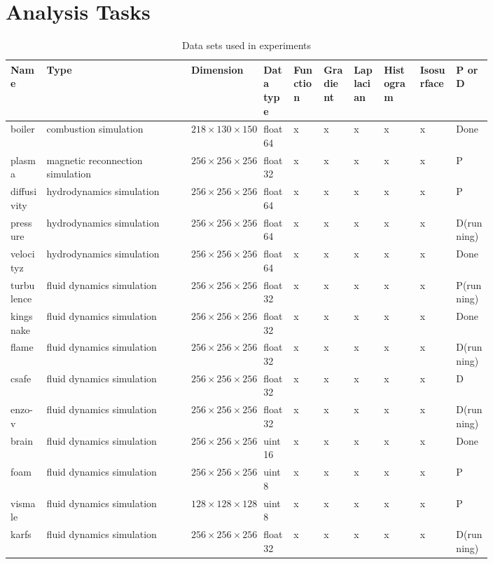 \section{ Analysis Tasks}\label{sec:analysis-tasks}

\begin{table*}[t]
  \caption{Data sets used in experiments }
  \centering
  \begin{tabular}{p{0.06\linewidth}p{0.24\linewidth}p{0.12\linewidth}p{0.05\linewidth}p{0.05\linewidth}p{0.05\linewidth}p{0.05\linewidth}p{0.06\linewidth}p{0.06\linewidth}p{0.06\linewidth}}
  \hline
  Name & Type & Dimension & Data type & Function & Gradient & Laplacian & Histogram & Isosurface & P or D\\
  \hline
  boiler & combustion simulation& $218\times 130 \times 150$ & float64 & x & x & x & x & x & Done \\
  plasma & magnetic reconnection simulation& $256\times 256 \times 256$ & float32 & x & x & x & x & x & P\\
  diffusivity & hydrodynamics simulation& $256\times 256\times 256$ & float64 & x & x & x & x & x & P\\
  pressure & hydrodynamics simulation& $256\times 256 \times 256$ & float64 & x & x & x & x & x & D(running)\\
  velocityz & hydrodynamics simulation& $256\times 256\times 256$ & float64 & x & x & x & x & x & Done\\
  turbulence & fluid dynamics simulation& $256\times 256 \times 256$ & float32 & x & x & x & x & x & P(running)\\
  kingsnake & fluid dynamics simulation& $256\times 256 \times 256$ & float32 & x & x & x & x & x & Done\\
  flame & fluid dynamics simulation& $256\times 256 \times 256$ & float32 & x & x & x & x & x & D(running)\\
  csafe & fluid dynamics simulation& $256\times 256 \times 256$ & float32 & x & x & x & x & x & D\\
  enzo-v & fluid dynamics simulation& $256\times 256 \times 256$ & float32 & x & x & x & x & x & D(running)\\
  brain & fluid dynamics simulation& $256\times 256 \times 256$ & uint16 & x & x & x & x & x & Done\\
  foam & fluid dynamics simulation& $256\times 256 \times 256$ & uint8 & x & x & x & x & x & P\\
  vismale & fluid dynamics simulation& $128\times 128 \times 128$ & uint8 & x & x & x & x & x & P\\
  karfs	& fluid dynamics simulation& $256\times 256 \times 256$ & float32 & x & x & x & x & x & D(running)\\
  \hline
  \end{tabular}\label{tbl:data-sets}
\end{table*}

